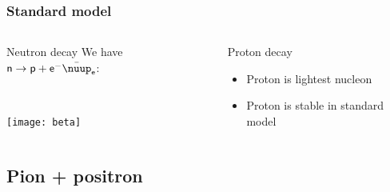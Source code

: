 \documentclass[english, fleqn]{beamer}
\begin{document}
\begin{frame}
    \frametitle{Standard model}

    \begin{columns}[t]
        \begin{column}{.5\linewidth}
            \begin{block}{Neutron decay}
                We have $\mathsf n \to \mathsf p + \mathsf e^- \bar\nuup_{\mathsf e}$:

                \

                \texttt{[image: beta]}
            \end{block}
        \end{column}
        \pause
        \begin{column}{.5\linewidth}
            \begin{block}{Proton decay}
                \begin{itemize}
                    \item Proton is lightest nucleon
                    \item \alert{Proton is stable in standard model}
                \end{itemize}
            \end{block}
        \end{column}
    \end{columns}
\end{frame}

\subsection{Pion + positron}
\end{document}
